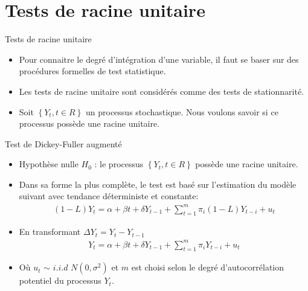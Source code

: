 \documentclass{beamer}
\begin{document}
\section{Tests de racine unitaire}
\frame{\tableofcontents[current]}

\begin{frame}{Tests de racine unitaire}
\begin{itemize}
\item Pour connaitre le degré d’intégration d’une variable, il faut se baser sur des procédures formelles de test statistique. 
\item Les tests de racine unitaire sont considérés comme des tests de stationnarité. 
\item Soit $\left\{ Y_t, t \in R \right\}$ un processus stochastique. Nous voulons savoir si ce processus possède une racine unitaire.
\end{itemize}
\end{frame}

\begin{frame}{Test de Dickey-Fuller augmenté}
\begin{itemize}
\item Hypothèse nulle $H_0$ : le processus $\left\{ Y_t, t \in R \right\}$ possède une racine unitaire.
\item Dans sa forme la plus complète, le test est basé sur l’estimation du modèle suivant avec tendance déterministe et constante:
\begin{align*}
(1-L)Y_t=\alpha+\beta t + \delta Y_{t-1}+\sum_{t=1}^m \pi_i(1-L)Y_{t-i}+u_t
\end{align*}
\item En transformant $\Delta Y_t=Y_t-Y_{t-1}$
\begin{align*}
Y_t=\alpha+\beta t + \delta Y_{t-1}+\sum_{t=1}^m \pi_iY_{t-i}+u_t
\end{align*}
\item Où $u_t$  $\sim$ $i.i.d$ $N(0,\sigma^2)$ et $m$ est choisi selon le degré d’autocorrélation potentiel du processus $Y_t$. 
\end{itemize}
\end{frame}
\end{document}
